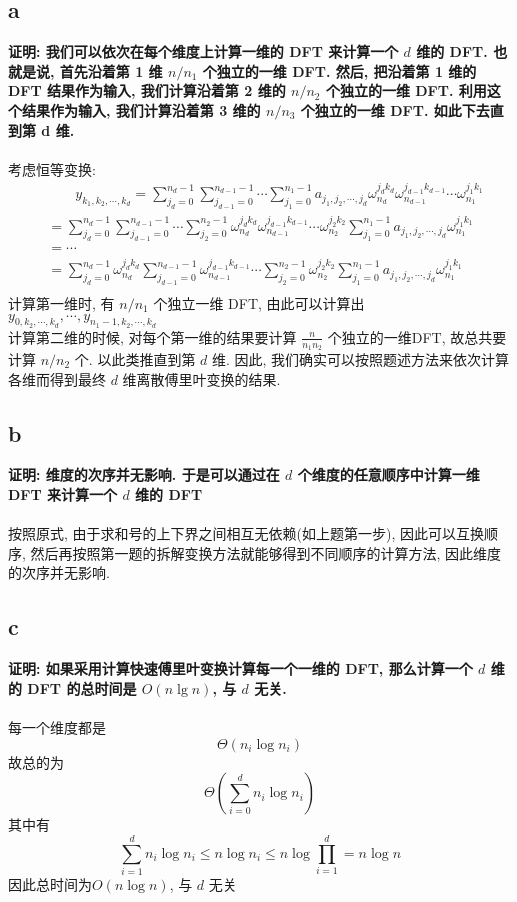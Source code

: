 \documentclass[UTF8]{article}
\newcommand{\jumpLine} {\hspace*{\fill} \\}
\begin{document}
\subsection*{a}
\noindent \textbf{证明: 我们可以依次在每个维度上计算一维的 DFT 来计算一个 $d$ 维的 DFT. 也就是说, 首先沿着第 1 维 $n/n_1$ 个独立的一维 DFT. 然后, 把沿着第 1 维的 DFT 结果作为输入, 我们计算沿着第 2 维的 $n/n_2$ 个独立的一维 DFT. 利用这个结果作为输入, 我们计算沿着第 3 维的 $n/n_3$ 个独立的一维 DFT. 如此下去直到第 d 维.}\\
\jumpLine
考虑恒等变换:
\begin{align*}
&\qquad y_{k_1,k_2,\cdots,k_d}=\sum\limits_{j_d=0}^{n_d-1}\sum\limits_{j_{d-1}=0}^{n_{d-1}-1}\cdots\sum\limits_{j_1=0}^{n_1-1}a_{j_1,j_2,\cdots,j_d}\omega_{n_d}^{j_dk_d}\omega_{n_{d-1}}^{j_{d-1}k_{d-1}}\cdots\omega_{n_1}^{j_1k_1}\\
&=\sum\limits_{j_d=0}^{n_d-1}\sum\limits_{j_{d-1}=0}^{n_{d-1}-1}\cdots\sum\limits_{j_{2}=0}^{n_{2}-1}\omega_{n_d}^{j_dk_d}\omega_{n_{d-1}}^{j_{d-1}k_{d-1}}\cdots\omega_{n_{2}}^{j_{2}k_{2}}\sum\limits_{j_{1}=0}^{n_{1}-1}a_{j_1,j_2,\cdots,j_d}\omega_{n_1}^{j_1k_1}\\
&=\cdots\\
&=\sum\limits_{j_d=0}^{n_d-1}\omega_{n_d}^{j_dk_d}\sum\limits_{j_{d-1}=0}^{n_{d-1}-1}\omega_{n_{d-1}}^{j_{d-1}k_{d-1}}\cdots\sum\limits_{j_{2}=0}^{n_{2}-1}\omega_{n_{2}}^{j_{2}k_{2}}\sum\limits_{j_{1}=0}^{n_{1}-1}a_{j_1,j_2,\cdots,j_d}\omega_{n_1}^{j_1k_1}\\
\end{align*}
计算第一维时, 有 $n/n_1$ 个独立一维 DFT, 由此可以计算出 $y_{0,k_2,\cdots,k_d}, \cdots, y_{n_1-1,k_2,\cdots,k_d}$\\
计算第二维的时候, 对每个第一维的结果要计算 $\frac{n}{n_1n_2}$ 个独立的一维DFT, 故总共要计算 $n/n_2$ 个.
以此类推直到第 $d$ 维.
因此, 我们确实可以按照题述方法来依次计算各维而得到最终 $d$ 维离散傅里叶变换的结果.
\subsection*{b}
\noindent \textbf{证明: 维度的次序并无影响. 于是可以通过在 $d$ 个维度的任意顺序中计算一维 DFT 来计算一个 $d$ 维的 DFT}\\
\jumpLine
按照原式, 由于求和号的上下界之间相互无依赖(如上题第一步), 因此可以互换顺序, 然后再按照第一题的拆解变换方法就能够得到不同顺序的计算方法, 因此维度的次序并无影响.
\subsection*{c}
\noindent \textbf{证明: 如果采用计算快速傅里叶变换计算每一个一维的 DFT, 那么计算一个 $d$ 维的 DFT 的总时间是 $O(n\lg n)$, 与 $d$ 无关.}\\
\jumpLine
每一个维度都是 $$\Theta(n_i\log n_i)$$
故总的为$$\Theta(\sum\limits_{i=0}^dn_i\log n_i)$$
其中有$$\sum\limits_{i=1}^dn_i\log n_i\le n\log n_i\le n\log\prod\limits_{i=1}^d=n\log n$$
因此总时间为$O(n\log n)$, 与 $d$ 无关
\end{document}
